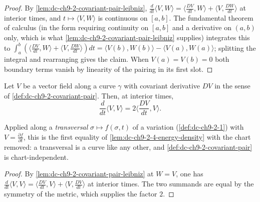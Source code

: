 \begin{proof}
  \leanok
  \sketch
  By \cref{lem:dc-ch9-2-covariant-pair-leibniz}, $\frac{d}{dt}\langle V,W\rangle
  =\langle\frac{DV}{dt},W\rangle+\langle V,\frac{DW}{dt}\rangle$ at interior times, and
  $t\mapsto\langle V,W\rangle$ is continuous on $[a,b]$. The fundamental theorem of
  calculus (in the form requiring continuity on $[a,b]$ and a derivative on $(a,b)$ only,
  which is what \cref{lem:dc-ch9-2-covariant-pair-leibniz} supplies) integrates this to
  $\int_a^b(\langle\frac{DV}{dt},W\rangle+\langle V,\frac{DW}{dt}\rangle)dt
  =\langle V(b),W(b)\rangle-\langle V(a),W(a)\rangle$; splitting the integral and
  rearranging gives the claim. When $V(a)=V(b)=0$ both boundary terms vanish by linearity
  of the pairing in its first slot.
\end{proof}
\begin{lemma}
  \label{lem:dc-ch9-2-4-density-self}
  \leanok
  Let $V$ be a vector field along a curve $\gamma$ with covariant derivative $DV$ in the
  sense of \cref{def:dc-ch9-2-covariant-pair}. Then, at interior times,
  $$
  \frac{d}{dt}\langle V,V\rangle = 2\Big\langle\frac{DV}{dt},V\Big\rangle.
  $$

  Applied along a \emph{transversal} $\sigma\mapsto f(\sigma,t)$ of a variation
  (\cref{def:dc-ch9-2-1}) with $V=\frac{\partial f}{\partial t}$, this is the first
  equality of \cref{lem:dc-ch9-2-4-energy-density} with the chart removed: a transversal is
  a curve like any other, and \cref{def:dc-ch9-2-covariant-pair} is chart-independent.
\end{lemma}
\begin{proof}
  \leanok
  \sketch
  By \cref{lem:dc-ch9-2-covariant-pair-leibniz} at $W=V$, one has
  $\frac{d}{dt}\langle V,V\rangle
  =\langle\frac{DV}{dt},V\rangle+\langle V,\frac{DV}{dt}\rangle$ at interior times. The two
  summands are equal by the symmetry of the metric, which supplies the factor $2$.

\end{proof}

